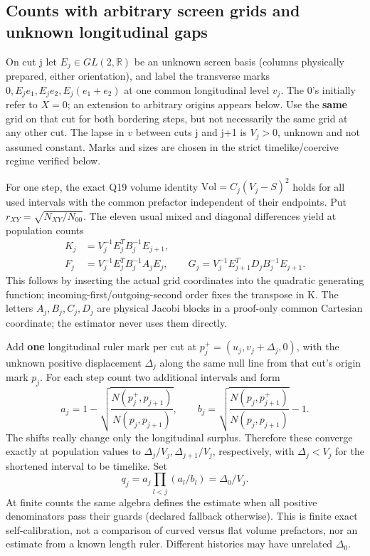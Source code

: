 \documentclass[11pt]{article}
\begin{document}
\subsection{Counts with arbitrary screen grids and unknown longitudinal gaps}\label{counts-with-arbitrary-screen-grids-and-unknown-longitudinal-gaps}

On cut j let \(E_j\in GL(2,\mathbb R)\) be an unknown screen basis (columns physically prepared, either orientation), and label the transverse marks \(0,E_je_1,E_je_2,E_j(e_1+e_2)\) at one common longitudinal level \(v_j\). The 0's initially refer to \(X=0\); an extension to arbitrary origins appears below. Use the \textbf{same} grid on that cut for both bordering steps, but not necessarily the same grid at any other cut. The lapse in \(v\) between cuts j and j+1 is \(V_j>0\), unknown and not assumed constant. Marks and sizes are chosen in the strict timelike/coercive regime verified below.

For one step, the exact Q19 volume identity \(\mathrm{Vol}=C_{j}(V_j-S)^2\) holds for all used intervals with the common prefactor independent of their endpoints. Put \(r_{XY}=\sqrt{N_{XY}/N_{00}}\). The eleven usual mixed and diagonal differences yield at population counts
\[
 \begin{split}
 K_j&=V_j^{-1}E_j^T B_j^{-1}E_{j+1},\\
 F_j&=V_j^{-1}E_j^T B_j^{-1}A_j E_j,\qquad
 G_j=V_j^{-1}E_{j+1}^T D_j B_j^{-1}E_{j+1}.
 \end{split}
\]
This follows by inserting the actual grid coordinates into the quadratic generating function; incoming-first/outgoing-second order fixes the transpose in K. The letters \(A_j,B_j,C_j,D_j\) are physical Jacobi blocks in a proof-only common Cartesian coordinate; the estimator never uses them directly.

Add \textbf{one} longitudinal ruler mark per cut at \(p_j^+=(u_j,v_j+\Delta_j,0)\), with the unknown positive displacement \(\Delta_j\) along the same null line from that cut's origin mark \(p_j\). For each step count two additional intervals and form
\[
 a_j=1-\sqrt{\frac{N(p_j^+,p_{j+1})}{N(p_j,p_{j+1})}},\qquad
 b_j=\sqrt{\frac{N(p_j,p_{j+1}^+)}{N(p_j,p_{j+1})}}-1 .
\]
The shifts really change only the longitudinal surplus. Therefore these converge exactly at population values to \(\Delta_j/V_j,\Delta_{j+1}/V_j\), respectively, with \(\Delta_j<V_j\) for the shortened interval to be timelike. Set
\[
 q_j=a_j\prod_{l<j}(a_l/b_l)=\Delta_0/V_j .
\]
At finite counts the same algebra defines the estimate when all positive denominators pass their guards (declared fallback otherwise). This is finite exact self-calibration, not a comparison of curved versus flat volume prefactors, nor an estimate from a known length ruler. Different histories may have unrelated \(\Delta_0\).
\end{document}
